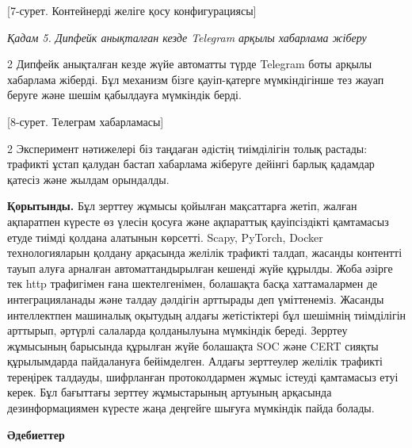 [7-сурет. Контейнерді желіге қосу конфигурациясы]

\emph{Қадам 5. Дипфейк анықталған кезде Telegram арқылы хабарлама
жіберу}

\begin{multicols}{2}
Дипфейк анықталған кезде жүйе автоматты түрде Telegram боты арқылы
хабарлама жіберді. Бұл механизм бізге қауіп-қатерге мүмкіндігінше тез
жауап беруге және шешім қабылдауға мүмкіндік берді.
\end{multicols}

[8-сурет. Телеграм хабарламасы]

\begin{multicols}{2}
Эксперимент нәтижелері біз таңдаған әдістің тиімділігін толық растады:
трафикті ұстап қалудан бастап хабарлама жіберуге дейінгі барлық қадамдар
қатесіз және жылдам орындалды.

{\bfseries Қорытынды.} Бұл зерттеу жұмысы қойылған мақсаттарға жетіп,
жалған ақпаратпен күресте өз үлесін қосуға және ақпараттық қауіпсіздікті
қамтамасыз етуде тиімді қолдана алатынын көрсетті. Scapy, PyTorch,
Docker технологияларын қолдану арқасында желілік трафикті талдап,
жасанды контентті тауып алуға арналған автоматтандырылған кешенді жүйе
құрылды. Жоба әзірге тек http трафигімен ғана шектелгенімен, болашақта
басқа хаттамалармен де интеграцияланады және талдау дәлдігін арттырады
деп үміттенеміз. Жасанды интеллектпен машиналық оқытудың алдағы
жетістіктері бұл шешімнің тиімділігін арттырып, әртүрлі салаларда
қолданылуына мүмкіндік береді. Зерртеу жұмысының барысында құрылған жүйе
болашақта SOC және CERT сияқты құрылымдарда пайдалануға бейімделген.
Алдағы зерттеулер желілік трафикті тереңірек талдауды, шифрланған
протоколдармен жұмыс істеуді қамтамасыз етуі керек. Бұл бағыттағы
зерттеу жұмыстарының артуының арқасында дезинформациямен күресте жаңа
деңгейге шығуға мүмкіндік пайда болады.
\end{multicols}

\begin{center}
{\bfseries Әдебиеттер}
\end{center}

